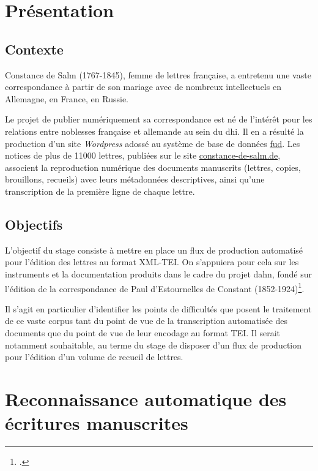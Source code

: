 \documentclass[a4paper,12pt,twoside]{book}
\begin{document}
	
	\tableofcontents
	
	\chapter*{Présentation}
	
		\section*{Contexte}
		Constance de Salm (1767-1845), femme de lettres française, a entretenu une vaste correspondance à partir de son mariage avec de nombreux intellectuels en Allemagne, en France, en Russie.

		Le projet de publier numériquement sa correspondance est né de l'intérêt pour les relations entre noblesses française et allemande au sein du \gls{dhi}. Il en a résulté la production d'un site \textit{Wordpress} adossé au système de base de données \href{https://fud.uni-trier.de/}{\gls{fud}}. Les notices de plus de 11000 lettres, publiées sur le site \href{https://constance-de-salm.de}{constance-de-salm.de}, associent la reproduction numérique des documents manuscrits (lettres, copies, brouillons, recueils) avec leurs métadonnées descriptives, ainsi qu'une transcription de la première ligne de chaque lettre.

		\section*{Objectifs}
		L'objectif du stage consiste à mettre en place un flux de production automatisé pour l'édition des lettres au format XML-TEI. On s'appuiera pour cela sur les instruments et la documentation produits dans le cadre du projet \gls{dahn}, fondé sur l'édition de la correspondance de Paul d’Estournelles de Constant (1852-1924)\footcite{chiffoleauDAHNProject}.
		
		Il s'agit en particulier d'identifier les points de difficultés que posent le traitement de ce vaste corpus tant du point de vue de la transcription automatisée des documents que du point de vue de leur encodage au format TEI. Il serait notamment souhaitable, au terme du stage de disposer d'un flux de production pour l'édition d'un volume de recueil de lettres.
			
	\chapter{Reconnaissance automatique des écritures manuscrites}
		
\end{document}
